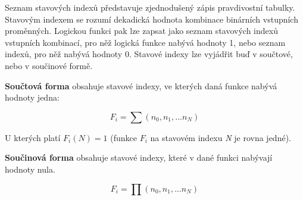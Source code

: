 
Seznam stavových indexů představuje zjednodušený zápis pravdivostní tabulky. Stavovým indexem se rozumí dekadická hodnota kombinace binárních vstupních proměnných. Logickou funkci pak lze zapsat jako seznam stavových indexů vstupních kombinací, pro něž logická funkce nabývá hodnoty 1, nebo seznam indexů, pro něž nabývá hodnoty 0. Stavové indexy lze vyjádřit buď v součtové, nebo v součinové formě.

{\bf Součtová forma} obsahuje stavové indexy, ve kterých daná funkce nabývá hodnoty jedna:

$$ F_i = \sum (n_0, n_1, ... n_N) $$

U kterých platí $F_i(N) = 1$ (funkce $F_i$ na stavovém indexu {\it N} je rovna jedné).

{\bf Součinová forma} obsahuje stavové indexy, které v dané funkci nabývají hodnoty nula.

$$ F_i = \prod (n_0, n_1, ... n_N) $$

